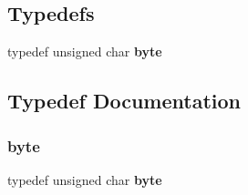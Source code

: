 \subsection*{Typedefs}
\begin{DoxyCompactItemize}
\item 
typedef unsigned char {\bf byte}
\end{DoxyCompactItemize}


\subsection{Typedef Documentation}
\label{_component_8hpp_a0c8186d9b9b7880309c27230bbb5e69d} 
\subsubsection{byte}
{\footnotesize\ttfamily typedef unsigned char {\bf byte}}

